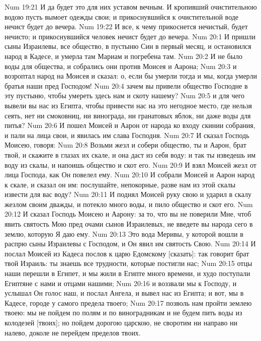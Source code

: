 \vs Num 19:21 И да будет это для них уставом вечным. И кропивший очистительною водою пусть вымоет одежды свои; и прикоснувшийся к очистительной воде нечист будет до вечера.
\vs Num 19:22 И все, к чему прикоснется нечистый, будет нечисто; и прикоснувшийся человек нечист будет до вечера.
\vs Num 20:1 И пришли сыны Израилевы, все общество, в пустыню Син в первый месяц, и остановился народ в Кадесе, и умерла там Мариам и погребена там.
\vs Num 20:2 И не было воды для общества, и собрались они против Моисея и Аарона;
\vs Num 20:3 и возроптал народ на Моисея и сказал: о, если бы умерли тогда и мы, когда умерли братья наши пред Господом!
\vs Num 20:4 зачем вы привели общество Господне в эту пустыню, чтобы умереть здесь нам и скоту нашему?
\vs Num 20:5 и для чего вывели вы нас из Египта, чтобы привести нас на это негодное место, где нельзя сеять, нет ни смоковниц, ни винограда, ни гранатовых яблок, ни даже воды для питья?
\vs Num 20:6 И пошел Моисей и Аарон от народа ко входу скинии собрания, и пали на лица свои, и явилась им слава Господня.
\rsbpar\vs Num 20:7 И сказал Господь Моисею, говоря:
\vs Num 20:8 Возьми жезл и собери общество, ты и Аарон, брат твой, и скажите в глазах их скале, и она даст из себя воду: и так ты изведешь им воду из скалы, и напоишь общество и скот его.
\vs Num 20:9 И взял Моисей жезл от лица Господа, как Он повелел ему.
\vs Num 20:10 И собрали Моисей и Аарон народ к скале, и сказал он им: послушайте, непокорные, разве нам из этой скалы извести для вас воду?
\vs Num 20:11 И поднял Моисей руку свою и ударил в скалу жезлом своим дважды, и потекло много воды, и пило общество и скот его.
\rsbpar\vs Num 20:12 И сказал Господь Моисею и Аарону: за то, что вы не поверили Мне, чтоб явить святость Мою пред очами сынов Израилевых, не введете вы народа сего в землю, которую Я даю ему.
\vs Num 20:13 Это вода Меривы, у которой вошли в распрю сыны Израилевы с Господом, и Он явил им святость Свою.
\rsbpar\vs Num 20:14 И послал Моисей из Кадеса послов к царю Едомскому [сказать]: так говорит брат твой Израиль: ты знаешь все трудности, которые постигли нас;
\vs Num 20:15 отцы наши перешли в Египет, и мы жили в Египте много времени, и худо поступали Египтяне с нами и отцами нашими;
\vs Num 20:16 и воззвали мы к Господу, и услышал Он голос наш, и послал Ангела, и вывел нас из Египта; и вот, мы в Кадесе, городе у самого предела твоего;
\vs Num 20:17 позволь нам пройти землею твоею: мы не пойдем по полям и по виноградникам и не будем пить воды из колодезей [твоих]; но пойдем дорогою царскою, не своротим ни направо ни налево, доколе не перейдем пределов твоих.

